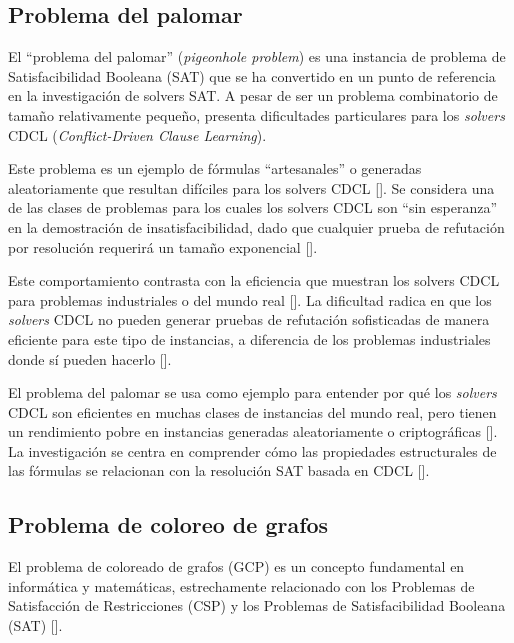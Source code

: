 \subsection{Problema del palomar}
\label{subsec:pingeonhole}
El ``problema del palomar'' (\textit{pigeonhole problem}) es una instancia de problema de Satisfacibilidad Booleana (SAT) que se ha convertido en un punto de referencia en la investigación de solvers SAT. A pesar de ser un problema combinatorio de tamaño relativamente pequeño, presenta dificultades particulares para los \textit{solvers} CDCL (\textit{Conflict-Driven Clause Learning}).

Este problema es un ejemplo de fórmulas “artesanales” o generadas aleatoriamente que resultan difíciles para los solvers CDCL [\cite{zulkoski2018understanding}]. %
Se considera una de las clases de problemas para los cuales los solvers CDCL son ``sin esperanza'' en la demostración de insatisfacibilidad, dado que cualquier prueba de refutación por resolución requerirá un tamaño exponencial [\cite{oh2016improving}]. %

Este comportamiento contrasta con la eficiencia que muestran los solvers CDCL para problemas industriales o del mundo real [\cite{zulkoski2018understanding}]. %
La dificultad radica en que los \textit{solvers} CDCL no pueden generar pruebas de refutación sofisticadas de manera eficiente para este tipo de instancias, a diferencia de los problemas industriales donde sí pueden hacerlo [\cite{oh2016improving}]. %

El problema del palomar se usa como ejemplo para entender por qué los \textit{solvers} CDCL son eficientes en muchas clases de instancias del mundo real, pero tienen un rendimiento pobre en instancias generadas aleatoriamente o criptográficas [\cite{ganesh_unreasonable}]. %
La investigación se centra en comprender cómo las propiedades estructurales de las fórmulas se relacionan con la resolución SAT basada en CDCL [\cite{zulkoski2018understanding}]. %

\subsection{Problema de coloreo de grafos}
\label{subsec:graph-coloring}
El problema de coloreado de grafos (GCP) es un concepto fundamental en informática y matemáticas, estrechamente relacionado con los Problemas de Satisfacción de Restricciones (CSP) y los Problemas de Satisfacibilidad Booleana (SAT) [\cite{almabetterCSP}]. %

